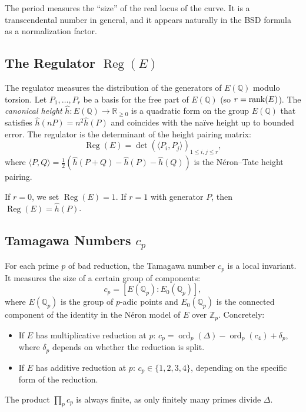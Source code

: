 The period measures the ``size'' of the real locus of the curve. It is a transcendental number in general, and it appears naturally in the BSD formula as a normalization factor.

\subsection{The Regulator $\operatorname{Reg}(E)$}

The regulator measures the distribution of the generators of $E(\mathbb{Q})$ modulo torsion. Let $P_1, \ldots, P_r$ be a basis for the free part of $E(\mathbb{Q})$ (so $r = \operatorname{rank}(E)$). The \emph{canonical height} $\hat{h}: E(\mathbb{Q}) \to \mathbb{R}_{\ge 0}$ is a quadratic form on the group $E(\mathbb{Q})$ that satisfies $\hat{h}(nP) = n^2 \hat{h}(P)$ and coincides with the naïve height up to bounded error. The regulator is the determinant of the height pairing matrix:
\[
\operatorname{Reg}(E) = \det\left(\langle P_i, P_j \rangle\right)_{1 \le i, j \le r},
\]
where $\langle P, Q \rangle = \frac{1}{2}(\hat{h}(P+Q) - \hat{h}(P) - \hat{h}(Q))$ is the N\'eron--Tate height pairing.

If $r = 0$, we set $\operatorname{Reg}(E) = 1$. If $r = 1$ with generator $P$, then $\operatorname{Reg}(E) = \hat{h}(P)$.

\subsection{Tamagawa Numbers $c_p$}

For each prime $p$ of bad reduction, the Tamagawa number $c_p$ is a local invariant. It measures the size of a certain group of components:
\[
c_p = [E(\mathbb{Q}_p) : E_0(\mathbb{Q}_p)],
\]
where $E(\mathbb{Q}_p)$ is the group of $p$-adic points and $E_0(\mathbb{Q}_p)$ is the connected component of the identity in the N\'eron model of $E$ over $\mathbb{Z}_p$. Concretely:
\begin{itemize}
\item If $E$ has multiplicative reduction at $p$: $c_p = \operatorname{ord}_p(\Delta) - \operatorname{ord}_p(c_4) + \delta_p$, where $\delta_p$ depends on whether the reduction is split.
\item If $E$ has additive reduction at $p$: $c_p \in \{1, 2, 3, 4\}$, depending on the specific form of the reduction.
\end{itemize}

The product $\prod_p c_p$ is always finite, as only finitely many primes divide $\Delta$.

